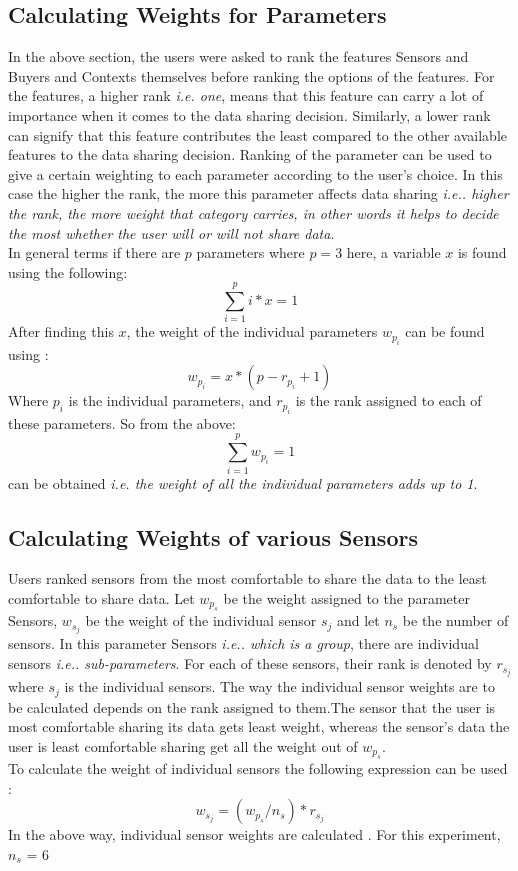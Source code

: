 \subsection{Calculating Weights for Parameters}
In the above section, the users were asked to rank the features Sensors and Buyers and Contexts themselves before ranking the options of the features. For the features, a higher rank {\it i.e. one}, means that this feature can carry a lot of
importance when it comes to the data sharing decision. Similarly, a lower rank can signify that this feature contributes the least compared to the other available features to the data sharing decision. 
Ranking of the parameter can be used to give a certain weighting to each parameter according to the user's choice. In this case the higher the rank, the more this parameter affects data sharing {\it i.e.. higher the rank, the more
weight that category carries, in other words it helps to decide the most whether the user will or will not share data}.\\
 In general terms if there are $p$ parameters where $p=3$ here, a variable $x$ is found using the following:
 $$\sum^{p}_{i=1} i*x = 1$$
After finding this $x$, the weight of the individual parameters $w_{p_{i}}$ can be found using :
$$w_{p_{i}} = x* (p - r_{p_{i}} + 1)$$
Where $p_{i}$ is the individual parameters, and $r_{p_{i}}$ is the rank assigned to each of these parameters.
So from the above: $$\sum^{p}_{i=1} w_{p_{i}} = 1$$ can be obtained {\it i.e. the weight of all the individual parameters adds up to 1}.

\subsection{Calculating Weights of various Sensors}
Users ranked sensors from the most comfortable to share the data to the least comfortable to share data.
Let $w_{p_{s}}$ be the weight assigned to the parameter Sensors, $w_{s_{j}}$ be the weight of the individual sensor $s_j$ and let $n_s$ be the number of sensors. In this parameter Sensors  {\it i.e.. which is a group}, there are individual sensors {\it i.e.. sub-parameters}.
For each of these sensors, their rank is denoted by $r_{s_{j}}$ where $s_j$ is the individual sensors. The way the individual sensor weights are to be 
calculated depends on the rank assigned to them.The sensor that the user is most comfortable sharing its data gets least weight, whereas the sensor's
data the user is least comfortable sharing get all the weight out of $w_{p_{s}}$.\\
To calculate the weight of individual sensors the following expression can be used :
$$w_{s_{j}} = (w_{p_{s}}/n_s)*r_{s_{j}}$$
In the above way, individual sensor weights are calculated . For this experiment, $n_s$ = 6

